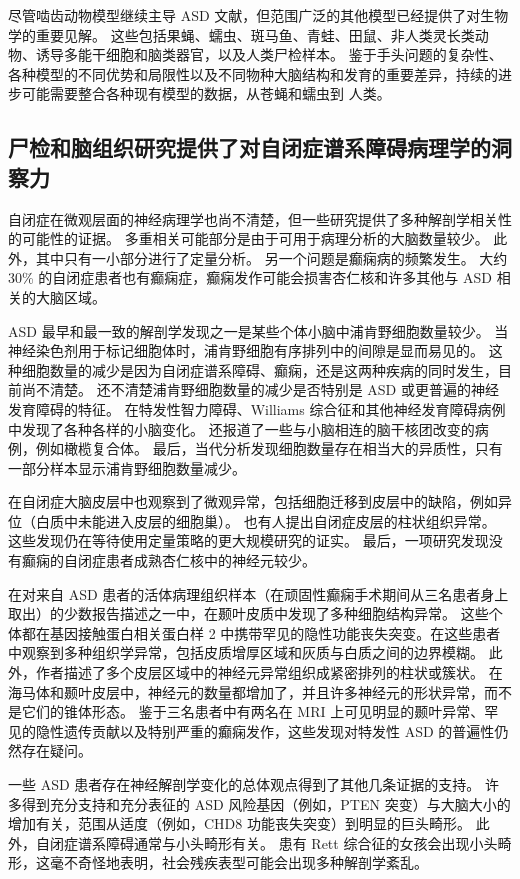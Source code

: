 尽管啮齿动物模型继续主导 ASD 文献，但范围广泛的其他模型已经提供了对生物学的重要见解。 这些包括果蝇、蠕虫、斑马鱼、青蛙、田鼠、非人类灵长类动物、诱导多能干细胞和脑类器官，以及人类尸检样本。 鉴于手头问题的复杂性、各种模型的不同优势和局限性以及不同物种大脑结构和发育的重要差异，持续的进步可能需要整合各种现有模型的数据，从苍蝇和蠕虫到 人类。

\subsection{尸检和脑组织研究提供了对自闭症谱系障碍病理学的洞察力}
自闭症在微观层面的神经病理学也尚不清楚，但一些研究提供了多种解剖学相关性的可能性的证据。 多重相关可能部分是由于可用于病理分析的大脑数量较少。 此外，其中只有一小部分进行了定量分析。 另一个问题是癫痫病的频繁发生。 大约 30\% 的自闭症患者也有癫痫症，癫痫发作可能会损害杏仁核和许多其他与 ASD 相关的大脑区域。

ASD 最早和最一致的解剖学发现之一是某些个体小脑中浦肯野细胞数量较少。 当神经染色剂用于标记细胞体时，浦肯野细胞有序排列中的间隙是显而易见的。 这种细胞数量的减少是因为自闭症谱系障碍、癫痫，还是这两种疾病的同时发生，目前尚不清楚。 还不清楚浦肯野细胞数量的减少是否特别是 ASD 或更普遍的神经发育障碍的特征。 在特发性智力障碍、Williams 综合征和其他神经发育障碍病例中发现了各种各样的小脑变化。 还报道了一些与小脑相连的脑干核团改变的病例，例如橄榄复合体。 最后，当代分析发现细胞数量存在相当大的异质性，只有一部分样本显示浦肯野细胞数量减少。

在自闭症大脑皮层中也观察到了微观异常，包括细胞迁移到皮层中的缺陷，例如异位（白质中未能进入皮层的细胞巢）。 也有人提出自闭症皮层的柱状组织异常。 这些发现仍在等待使用定量策略的更大规模研究的证实。 最后，一项研究发现没有癫痫的自闭症患者成熟杏仁核中的神经元较少。

在对来自 ASD 患者的活体病理组织样本（在顽固性癫痫手术期间从三名患者身上取出）的少数报告描述之一中，在颞叶皮质中发现了多种细胞结构异常。 这些个体都在基因接触蛋白相关蛋白样 2 中携带罕见的隐性功能丧失突变。在这些患者中观察到多种组织学异常，包括皮质增厚区域和灰质与白质之间的边界模糊。 此外，作者描述了多个皮层区域中的神经元异常组织成紧密排列的柱状或簇状。 在海马体和颞叶皮层中，神经元的数量都增加了，并且许多神经元的形状异常，而不是它们的锥体形态。 鉴于三名患者中有两名在 MRI 上可见明显的颞叶异常、罕见的隐性遗传贡献以及特别严重的癫痫发作，这些发现对特发性 ASD 的普遍性仍然存在疑问。

一些 ASD 患者存在神经解剖学变化的总体观点得到了其他几条证据的支持。 许多得到充分支持和充分表征的 ASD 风险基因（例如，PTEN 突变）与大脑大小的增加有关，范围从适度（例如，CHD8 功能丧失突变）到明显的巨头畸形。 此外，自闭症谱系障碍通常与小头畸形有关。 患有 Rett 综合征的女孩会出现小头畸形，这毫不奇怪地表明，社会残疾表型可能会出现多种解剖学紊乱。

